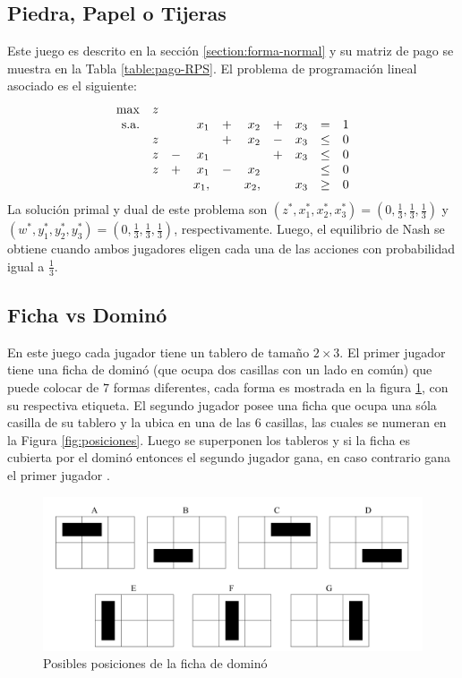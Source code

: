 \subsection{Piedra, Papel o Tijeras}

Este juego es descrito en la sección \ref{section:forma-normal} y su matriz de pago se muestra en la Tabla \ref{table:pago-RPS}. El problema de programación lineal asociado es el siguiente:
\begin{equation}
\begin{array}{r r r r r r r r r r}
\max  & z &  & & & & &\\
\text{s.a.}  
&   &   & x_1  & + & x_2  & + & x_3 & =    & 1 \\
& z &   &      & + & x_2  & - & x_3 & \leq & 0 \\
& z & - & x_1  &   &      & + & x_3 & \leq & 0 \\
& z & + & x_1  & - & x_2  &   &     & \leq & 0 \\
&   &   & x_1, &   & x_2, &   & x_3 & \geq & 0
\end{array}
\end{equation}
La solución primal y dual de este problema son $(z^*, x_1^*, x_2^*, x_3^*) = (0, \frac{1}{3}, \frac{1}{3}, \frac{1}{3})$ y $(w^*, y_1^*, y_2^*, y_3^*) = (0, \frac{1}{3}, \frac{1}{3}, \frac{1}{3})$, respectivamente. Luego, el equilibrio de Nash se obtiene cuando ambos jugadores eligen cada una de las acciones con probabilidad igual a $\frac{1}{3}$.

\subsection{Ficha vs Dominó}

En este juego cada jugador tiene un tablero de tamaño $2\times 3$. El primer jugador tiene una ficha de dominó (que ocupa dos casillas con un lado en común) que puede colocar de $7$ formas diferentes, cada forma es mostrada en la figura \ref{fig:posiciones-domino}, con su respectiva etiqueta. El segundo jugador posee una ficha que ocupa una sóla casilla de su tablero y la ubica en una de las $6$ casillas, las cuales se numeran en la Figura \ref{fig:posiciones}. Luego se superponen los tableros y si la ficha es cubierta por el dominó entonces el segundo jugador gana, en caso contrario gana el primer jugador \cite[p. 237]{bib:pl-chvatal}.

\begin{figure}[hbt]
\caption{Posibles posiciones de la ficha de dominó}
\label{fig:posiciones-domino}
\centering
\includegraphics[width=1\textwidth]{figuras/posiciones-domino.png}
\end{figure}

